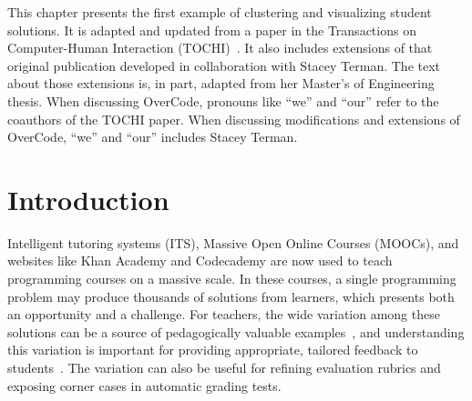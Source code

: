 This chapter presents the first example of clustering and visualizing student solutions. It is adapted and updated  from a paper in the Transactions on Computer-Human Interaction (TOCHI)~\cite{overcode}. It also includes extensions of that original publication developed in collaboration with Stacey Terman. The text about those extensions is, in part, adapted from her Master's of Engineering thesis. When discussing OverCode, pronouns like ``we'' and ``our'' refer to the coauthors of the TOCHI paper. When discussing modifications and extensions of OverCode, ``we'' and ``our'' includes Stacey Terman.

\section{Introduction}

Intelligent tutoring systems (ITS), Massive Open Online Courses (MOOCs), and websites like Khan Academy and Codecademy are now used to teach programming courses on a massive scale. In these courses, a single programming problem may produce thousands of solutions from learners, which presents both an opportunity and a challenge. For teachers, the wide variation among these solutions can be a source of pedagogically valuable examples~\cite{marton13}, and understanding this variation is important for providing appropriate, tailored feedback to students~\cite{basupowergrading,MOOCshop}. The variation can also be useful for refining evaluation rubrics and exposing corner cases in automatic grading tests.

